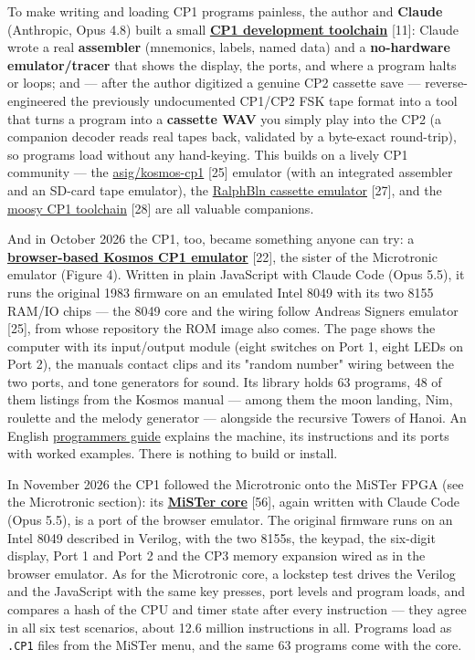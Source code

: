 \documentclass[
  11pt,
  letterpaper,
]{article}
\begin{document}
To make writing and loading CP1 programs painless, the author and
\textbf{Claude} (Anthropic, Opus 4.8) built a small
\href{https://github.com/lambdamikel/kosmos-cp1-devel-toolchain}{\textbf{CP1
development toolchain}} {[}11{]}: Claude wrote a real \textbf{assembler}
(mnemonics, labels, named data) and a \textbf{no-hardware
emulator/tracer} that shows the display, the ports, and where a program
halts or loops; and --- after the author digitized a genuine CP2
cassette save --- reverse-engineered the previously undocumented CP1/CP2
FSK tape format into a tool that turns a program into a \textbf{cassette
WAV} you simply play into the CP2 (a companion decoder reads real tapes
back, validated by a byte-exact round-trip), so programs load without
any hand-keying. This builds on a lively CP1 community --- the
\href{https://github.com/asig/kosmos-cp1}{asig/kosmos-cp1} {[}25{]}
emulator (with an integrated assembler and an SD-card tape emulator),
the
\href{https://github.com/RalphBln/kosmos-cp1-arduino-cassette-emulator}{RalphBln
cassette emulator} {[}27{]}, and the
\href{https://github.com/moosy/kosmos-cp1-toolchain}{moosy CP1
toolchain} {[}28{]} are all valuable companions.

And in October 2026 the CP1, too, became something anyone can try: a
\href{https://lambdamikel.github.io/kosmos-cp1-emulator/}{\textbf{browser-based
Kosmos CP1 emulator}} {[}22{]}, the sister of the Microtronic emulator
(Figure 4). Written in plain JavaScript with Claude Code (Opus 5.5), it
runs the original 1983 firmware on an emulated Intel 8049 with its two
8155 RAM/IO chips --- the 8049 core and the wiring follow Andreas
Signer\textquotesingle s emulator {[}25{]}, from whose repository the
ROM image also comes. The page shows the computer with its input/output
module (eight switches on Port 1, eight LEDs on Port 2), the
manual\textquotesingle s contact clips and its "random number" wiring
between the two ports, and tone generators for sound. Its library holds
63 programs, 48 of them listings from the Kosmos manual --- among them
the moon landing, Nim, roulette and the melody generator --- alongside
the recursive Towers of Hanoi. An English
\href{https://lambdamikel.github.io/kosmos-cp1-emulator/guide.html}{programmer\textquotesingle s
guide} explains the machine, its instructions and its ports with worked
examples. There is nothing to build or install.

In November 2026 the CP1 followed the Microtronic onto the MiSTer FPGA
(see the Microtronic section): its
\href{https://github.com/lambdamikel/KosmosCP1_MiSTer}{\textbf{MiSTer
core}} {[}56{]}, again written with Claude Code (Opus 5.5), is a port of
the browser emulator. The original firmware runs on an Intel 8049
described in Verilog, with the two 8155s, the keypad, the six-digit
display, Port 1 and Port 2 and the CP3 memory expansion wired as in the
browser emulator. As for the Microtronic core, a lockstep test drives
the Verilog and the JavaScript with the same key presses, port levels
and program loads, and compares a hash of the CPU and timer state after
every instruction --- they agree in all six test scenarios, about 12.6
million instructions in all. Programs load as \texttt{.CP1} files from
the MiSTer menu, and the same 63 programs come with the core.
\end{document}
